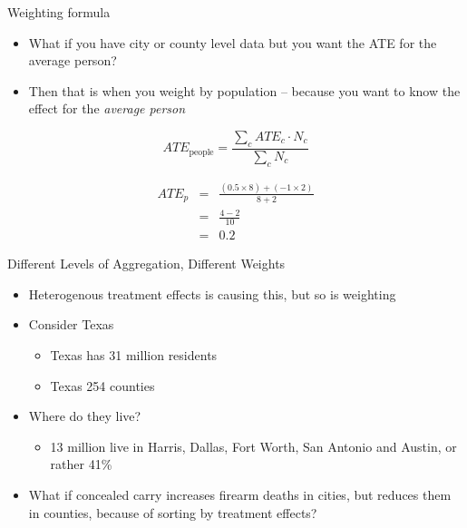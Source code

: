 \documentclass[aspectratio=169,11pt]{beamer}
\begin{document}
\begin{frame}{Weighting formula}

\begin{itemize}
\item What if you have city or county level data but you want the ATE for the average person? 
\item Then that is when you weight by population -- because you want to know the effect for the \emph{average person}
\end{itemize}

\begin{equation}
ATE_{\text{people}} = \frac{\sum_c ATE_c \cdot N_c}{\sum_c N_c}
\end{equation}

\begin{eqnarray*}
ATE_p &=& \frac{(0.5 \times 8) + (-1 \times 2)}{8 + 2} \\
      &=& \frac{4 - 2}{10} \\
      &=& 0.2
\end{eqnarray*}

\end{frame}




\begin{frame}{Different Levels of Aggregation, Different Weights}


\begin{itemize}
\item Heterogenous treatment effects is causing this, but so is weighting
\item Consider Texas
	\begin{itemize}
	\item Texas has 31 million residents
	\item Texas 254 counties
	\end{itemize}
\item Where do they live?
	\begin{itemize}
	\item 13 million live in Harris, Dallas, Fort Worth, San Antonio and Austin, or rather 41\% 
	\end{itemize}
\item What if concealed carry increases firearm deaths in cities, but reduces them in counties, because of sorting by treatment effects?
\end{itemize}

\end{frame}
\end{document}
